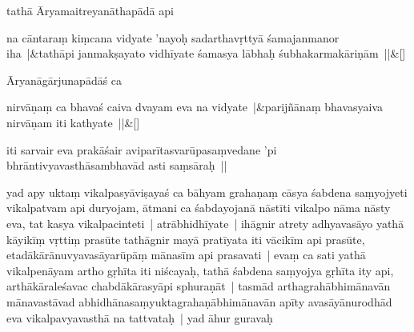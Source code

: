 \documentclass[article,12pt,a4paper]{memoir}%
\newcounter{parCount}
\begin{document}
	  
	  

	  
	  \pstart \leavevmode%
	\label{thakur75-139.5}tathā Āryamaitreyanāthapādā api 
	{}
	\pend%
      
	    
	    \stanza[\smallbreak]
	  na cāntaraṃ kiṃcana vidyate 'nayoḥ sadarthavṛttyā śamajanmanor iha |&tathāpi janmakṣayato vidhīyate śamasya lābhaḥ śubhakarmakāriṇām ||\&[\smallbreak]
	  
	  
	  

	  
	  \pstart \leavevmode%
	\label{thakur75-139.10}Āryanāgārjunapādāś ca 
	{}
	\pend%
      
	    
	    \stanza[\smallbreak]
	  nirvāṇaṃ ca bhavaś caiva dvayam eva na vidyate |&parijñānaṃ bhavasyaiva nirvāṇam iti kathyate ||\&[\smallbreak]
	  
	  
	  

	  
	  \pstart \leavevmode%
	iti sarvair eva prakāśair aviparītasvarūpasaṃvedane 'pi bhrāntivyavasthāsambhavād asti saṃsāraḥ || 
	{}
	\pend%
      

	  
	  \pstart \leavevmode%
	\label{thakur75-139.15}yad apy uktaṃ vikalpasyāviṣayaś ca bāhyam grahaṇaṃ cāsya śabdena saṃyojyeti vikalpatvam api duryojam, ā\label{capv-np-13b-end}tmani ca śabdayojanā nāstīti vikalpo nāma nāsty eva, tat kasya vikalpacinteti | atrābhidhīyate | ihāgnir atrety adhyavasāyo yathā kāyikīṃ vṛttiṃ prasūte tathāgnir mayā pratīyata iti vācikīm api prasūte, etadākārānuvyavasāyarūpāṃ mānasīm api prasavati | evaṃ ca sati yathā vikalpenāyam artho gṛhīta iti niścayaḥ, tathā śabdena saṃyojya gṛhīta ity api, arthākāraleśavac chabdākārasyāpi sphuraṇāt | tasmād arthagrahābhimānavān mānavastāvad abhidhānasaṃyuktagrahaṇābhimānavān apīty avasāyānurodhād eva vikalpavyavasthā na tattvataḥ | yad āhur guravaḥ
	{}
	\pend%
      
\end{document}
